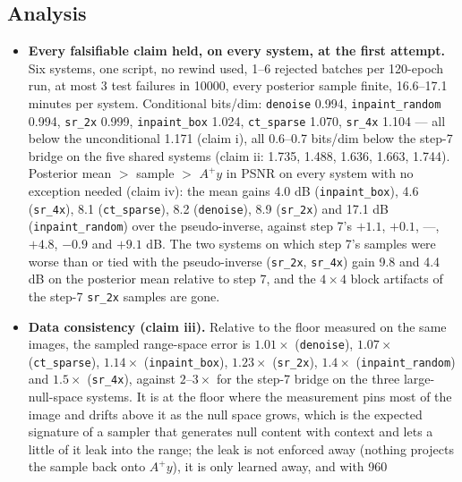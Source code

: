 \documentclass[11pt]{article}
\begin{document}
\subsection{Analysis}
\label{sec:step8analysis}
\begin{itemize}
  \item \textbf{Every falsifiable claim held, on every system, at the first
        attempt.} Six systems, one script, no rewind used, 1--6 rejected
        batches per 120-epoch run, at most 3 test failures in 10000, every
        posterior sample finite, 16.6--17.1 minutes per system. Conditional
        bits/dim: \texttt{denoise} 0.994, \texttt{inpaint\_random} 0.994,
        \texttt{sr\_2x} 0.999, \texttt{inpaint\_box} 1.024,
        \texttt{ct\_sparse} 1.070, \texttt{sr\_4x} 1.104 --- all below the
        unconditional 1.171 (claim i), all 0.6--0.7 bits/dim below the
        step-7 bridge on the five shared systems (claim ii: 1.735, 1.488,
        1.636, 1.663, 1.744). Posterior mean $>$ sample $>$ $A^{+}y$ in
        PSNR on every system with no exception needed (claim iv): the mean
        gains 4.0 dB (\texttt{inpaint\_box}), 4.6 (\texttt{sr\_4x}), 8.1
        (\texttt{ct\_sparse}), 8.2 (\texttt{denoise}), 8.9 (\texttt{sr\_2x})
        and 17.1 dB (\texttt{inpaint\_random}) over the pseudo-inverse,
        against step 7's $+1.1$, $+0.1$, ---, $+4.8$, $-0.9$ and $+9.1$ dB.
        The two systems on which step 7's samples were worse than or tied
        with the pseudo-inverse (\texttt{sr\_2x}, \texttt{sr\_4x}) gain
        9.8 and 4.4 dB on the posterior mean relative to step 7, and the
        $4\times4$ block artifacts of the step-7 \texttt{sr\_2x} samples are
        gone.
  \item \textbf{Data consistency (claim iii).} Relative to the floor
        measured on the same images, the sampled range-space error is
        $1.01\times$ (\texttt{denoise}), $1.07\times$ (\texttt{ct\_sparse}),
        $1.14\times$ (\texttt{inpaint\_box}), $1.23\times$ (\texttt{sr\_2x}),
        $1.4\times$ (\texttt{inpaint\_random}) and $1.5\times$
        (\texttt{sr\_4x}), against $2$--$3\times$ for the step-7 bridge on
        the three large-null-space systems. It is at the floor where the
        measurement pins most of the image and drifts above it as the null
        space grows, which is the expected signature of a sampler that
        generates null content with context and lets a little of it leak
        into the range; the leak is not enforced away (nothing projects the
        sample back onto $A^{+}y$), it is only learned away, and with 960

\end{itemize}
\end{document}
